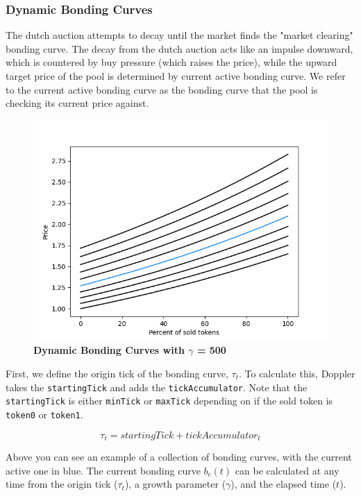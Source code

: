 \documentclass[sigconf,nonacm,prologue,table]{acmart}
\numberwithin{equation}{section}
\theoremstyle{definition}
\theoremstyle{remark}
\begin{document}
\subsubsection{Dynamic Bonding Curves} 

The dutch auction attempts to decay until the market finds the "market clearing" bonding curve. The decay from the dutch auction acts like an impulse downward, which is countered by buy pressure (which raises the price), while the upward target price of the pool is determined by current active bonding curve. We refer to the current active bonding curve as the bonding curve that the pool is checking its current price against. 

\begin{figure}[H]
    \centering
    \includegraphics[scale=0.45]{images/curves.png} \caption{\textbf{Dynamic Bonding Curves with $\gamma$ = 500}}
\end{figure}

First, we define the origin tick of the bonding curve, $\tau_t$. To calculate this, Doppler takes the \verb|startingTick| and adds the \verb|tickAccumulator|. Note that the \verb|startingTick| is either \verb|minTick| or \verb|maxTick| depending on if the sold token is \verb|token0| or \verb|token1|.

\begin{equation}
    \tau_{t} = startingTick + tickAccumulator_t
\end{equation}

Above you can see an example of a collection of bonding curves, with the current active one in blue. The current bonding curve $b_c(t)$ can be calculated at any time from the origin tick ($\tau_t$), a growth parameter ($\gamma$), and the elapsed time ($t$). 
\end{document}
